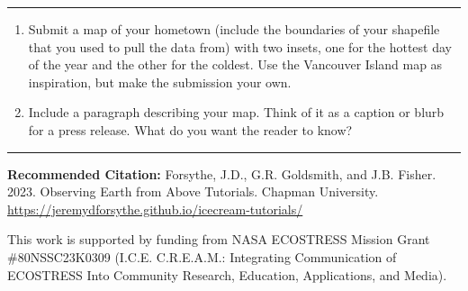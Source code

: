 \documentclass[oneside,a4paper,11pt,explicit]{book}
\begin{document}
\vspace{.25em}
	
\hrule

\vspace{1 em}
	
\begin{tcolorbox}[colback=yellow!5!white,colframe=IceCreamOrbit,title= \vspace{.2em} \Large Map of the Week Assignments]
	\large
	\begin{enumerate}
		\item Submit a map of your hometown (include the boundaries of your shapefile that you used to pull the data from) with two insets, one for the hottest day of the year and the other for the coldest. Use the Vancouver Island map as inspiration, but make the submission your own.  
		\item Include a paragraph describing your map. Think of it as a caption or blurb for a press release. What do you want the reader to know?
	\end{enumerate}	
\end{tcolorbox}
	
\vfill
	
\hrule
	
\vspace{1em}
	
\textbf{Recommended Citation:} Forsythe, J.D., G.R. Goldsmith, and J.B. Fisher. 2023. Observing Earth from Above Tutorials. Chapman University. \url{https://jeremydforsythe.github.io/icecream-tutorials/}
	
\vspace{1em}
	
This work is supported by funding from NASA ECOSTRESS Mission Grant \#80NSSC23K0309 (I.C.E. C.R.E.A.M.: Integrating Communication of ECOSTRESS Into Community Research, Education, Applications, and Media).
	
\end{document}
